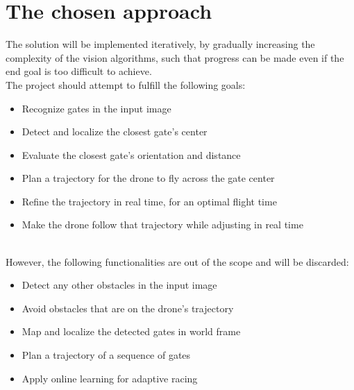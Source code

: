 \section{The chosen approach}


The solution will be implemented iteratively, by gradually increasing the
complexity of the vision algorithms, such that progress can be made even if the
end goal is too difficult to achieve.\\

The project should attempt to fulfill the following goals:

\begin{itemize}
	\item{Recognize gates in the input image}
	\item{Detect and localize the closest gate's center}
	\item{Evaluate the closest gate's orientation and distance}
	\item{Plan a trajectory for the drone to fly across the gate center}
	\item{Refine the trajectory in real time, for an optimal flight time}
	\item{Make the drone follow that trajectory while adjusting in real time}
\end{itemize}
~\\
However, the following functionalities are out of the scope and will be
discarded:

\begin{itemize}
	\item{Detect any other obstacles in the input image}
	\item{Avoid obstacles that are on the drone's trajectory}
	\item{Map and localize the detected gates in world frame}
	\item{Plan a trajectory of a sequence of gates}
	\item{Apply online learning for adaptive racing}
\end{itemize}


